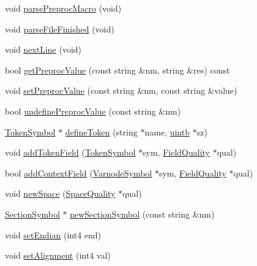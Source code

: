 \begin{DoxyCompactItemize}
\item 
void \mbox{\hyperlink{class_sleigh_compile_a0e8ce37c68e8460ca6d82e45b55d7ac7}{parse\+Preproc\+Macro}} (void)
\item 
void \mbox{\hyperlink{class_sleigh_compile_a70eb25a26cb9e8f0b4e8ef44511c3f78}{parse\+File\+Finished}} (void)
\item 
void \mbox{\hyperlink{class_sleigh_compile_a46a32d2f2db362b1f29264b6a7e648ec}{next\+Line}} (void)
\item 
bool \mbox{\hyperlink{class_sleigh_compile_a009d448b5035a45a520b85074b0d545a}{get\+Preproc\+Value}} (const string \&nm, string \&res) const
\item 
void \mbox{\hyperlink{class_sleigh_compile_af5f1126e010ecd977386150a77349137}{set\+Preproc\+Value}} (const string \&nm, const string \&value)
\item 
bool \mbox{\hyperlink{class_sleigh_compile_a02e6d60fbc4ba8092f484f586ed34397}{undefine\+Preproc\+Value}} (const string \&nm)
\item 
\mbox{\hyperlink{class_token_symbol}{Token\+Symbol}} $\ast$ \mbox{\hyperlink{class_sleigh_compile_a3853fde5e5b1777fc03c8780ff9bdeaa}{define\+Token}} (string $\ast$name, \mbox{\hyperlink{types_8h_a2db313c5d32a12b01d26ac9b3bca178f}{uintb}} $\ast$sz)
\item 
void \mbox{\hyperlink{class_sleigh_compile_a5c22093ca6485e902e05da5df71d651a}{add\+Token\+Field}} (\mbox{\hyperlink{class_token_symbol}{Token\+Symbol}} $\ast$sym, \mbox{\hyperlink{struct_field_quality}{Field\+Quality}} $\ast$qual)
\item 
bool \mbox{\hyperlink{class_sleigh_compile_aa78e3d963607a1caea759cff7127123b}{add\+Context\+Field}} (\mbox{\hyperlink{class_varnode_symbol}{Varnode\+Symbol}} $\ast$sym, \mbox{\hyperlink{struct_field_quality}{Field\+Quality}} $\ast$qual)
\item 
void \mbox{\hyperlink{class_sleigh_compile_afadd41c3c850e824d48ec7c2638304c8}{new\+Space}} (\mbox{\hyperlink{struct_space_quality}{Space\+Quality}} $\ast$qual)
\item 
\mbox{\hyperlink{class_section_symbol}{Section\+Symbol}} $\ast$ \mbox{\hyperlink{class_sleigh_compile_a1ba500a5fecf35e16b0721afa600e857}{new\+Section\+Symbol}} (const string \&nm)
\item 
void \mbox{\hyperlink{class_sleigh_compile_a4790923ffdd979ec948a9396ab23b969}{set\+Endian}} (int4 end)
\item 
void \mbox{\hyperlink{class_sleigh_compile_a603d689850a06d968f17792238764e32}{set\+Alignment}} (int4 val)
\item 

\end{DoxyCompactItemize}
